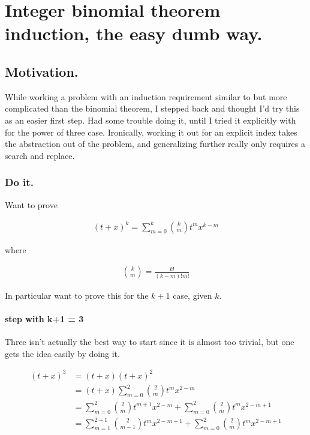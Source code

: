 \chapter{Integer binomial theorem induction, the easy dumb way.}
\label{chap:binomial}
\date{ March 26, 2009.   binomial.tex }

\section{Motivation.}

While working a problem with an induction requirement similar to but more 
complicated than the binomial theorem, I stepped back and thought I'd try
this as an easier first step.  Had some trouble doing it, until I tried it
explicitly with for the power of three case.  Ironically, working it
out for an explicit index takes the abstraction out of the problem, and
generalizing further really only requires a search and replace.

\subsection{Do it.}

Want to prove

\begin{align}
(t + x)^k = \sum_{m=0}^k \binom{k}{m} t^m x^{k-m}
\end{align}

where

\begin{align}
\binom{k}{m} = \frac{k!}{(k-m)!m!}
\end{align}

In particular want to prove this for the $k+1$ case, given $k$.

\subsubsection{step with k+1 = 3}

Three isn't actually the best way to start since it is almost too trivial, but
one gets the idea easily by doing it.

\begin{align*}
(t + x)^3 
&= (t + x)(t + x)^2  \\
&= (t + x)\sum_{m=0}^2 \binom{2}{m} t^m x^{2-m} \\
&= 
\sum_{m=0}^2 \binom{2}{m} t^{m+1} x^{2-m}
+ \sum_{m=0}^2 \binom{2}{m} t^{m} x^{2-m + 1} \\
&= 
\sum_{m=1}^{2 + 1} \binom{2}{m-1} t^{m} x^{2 - m + 1}
+ \sum_{m=0}^2 \binom{2}{m} t^{m} x^{2-m + 1} \\
\end{align*}

